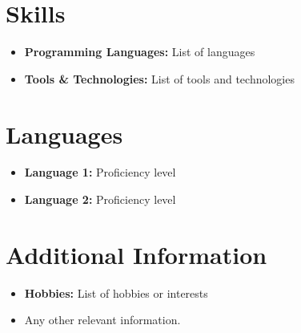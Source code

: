 \documentclass[a4paper,10pt]{article}
\begin{document}
\section*{Skills}
\begin{itemize}[leftmargin=0.5cm]
    \item \textbf{Programming Languages:} List of languages
    \item \textbf{Tools \& Technologies:} List of tools and technologies
\end{itemize}

\section*{Languages}
\begin{itemize}[leftmargin=0.5cm]
    \item \textbf{Language 1:} Proficiency level
    \item \textbf{Language 2:} Proficiency level
\end{itemize}

\section*{Additional Information}
\begin{itemize}[leftmargin=0.5cm]
    \item \textbf{Hobbies:} List of hobbies or interests
    \item Any other relevant information.
\end{itemize}
\end{document}
